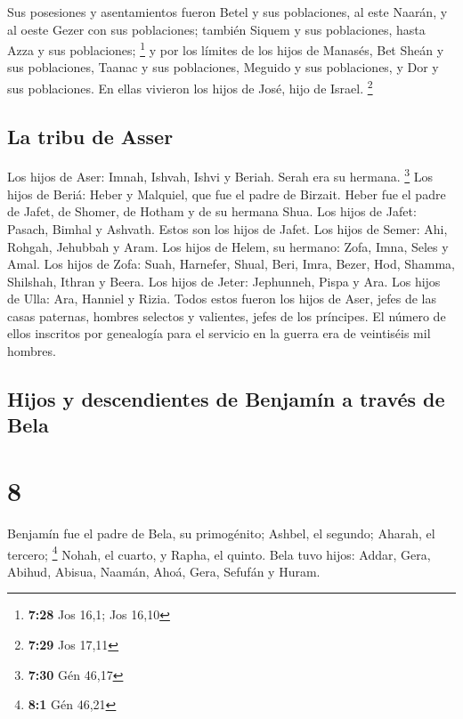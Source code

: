  Sus posesiones y asentamientos fueron Betel y sus
poblaciones, al este Naarán, y al oeste Gezer con sus poblaciones;
también Siquem y sus poblaciones, hasta Azza y sus poblaciones;
\footnote{\textbf{7:28} Jos 16,1; Jos 16,10}  y por los
límites de los hijos de Manasés, Bet Sheán y sus poblaciones, Taanac y
sus poblaciones, Meguido y sus poblaciones, y Dor y sus poblaciones. En
ellas vivieron los hijos de José, hijo de Israel. \footnote{\textbf{7:29}
  Jos 17,11}

\hypertarget{la-tribu-de-asser}{%
\subsection{La tribu de Asser}\label{la-tribu-de-asser}}

 Los hijos de Aser: Imnah, Ishvah, Ishvi y Beriah. Serah
era su hermana. \footnote{\textbf{7:30} Gén 46,17}  Los
hijos de Beriá: Heber y Malquiel, que fue el padre de Birzait.
 Heber fue el padre de Jafet, de Shomer, de Hotham y de
su hermana Shua.  Los hijos de Jafet: Pasach, Bimhal y
Ashvath. Estos son los hijos de Jafet.  Los hijos de
Semer: Ahi, Rohgah, Jehubbah y Aram.  Los hijos de Helem,
su hermano: Zofa, Imna, Seles y Amal.  Los hijos de Zofa:
Suah, Harnefer, Shual, Beri, Imra,  Bezer, Hod, Shamma,
Shilshah, Ithran y Beera.  Los hijos de Jeter: Jephunneh,
Pispa y Ara.  Los hijos de Ulla: Ara, Hanniel y Rizia.
 Todos estos fueron los hijos de Aser, jefes de las casas
paternas, hombres selectos y valientes, jefes de los príncipes. El
número de ellos inscritos por genealogía para el servicio en la guerra
era de veintiséis mil hombres.

\hypertarget{hijos-y-descendientes-de-benjamuxedn-a-travuxe9s-de-bela}{%
\subsection{Hijos y descendientes de Benjamín a través de
Bela}\label{hijos-y-descendientes-de-benjamuxedn-a-travuxe9s-de-bela}}

\hypertarget{section-7}{%
\section{8}\label{section-7}}

 Benjamín fue el padre de Bela, su primogénito; Ashbel, el
segundo; Aharah, el tercero; \footnote{\textbf{8:1} Gén 46,21}
 Nohah, el cuarto, y Rapha, el quinto.  Bela
tuvo hijos: Addar, Gera, Abihud,  Abisua, Naamán, Ahoá,
 Gera, Sefufán y Huram.

